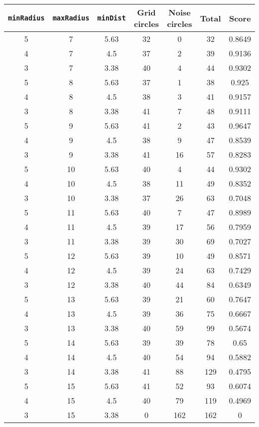 \documentclass[letterpaper, 12pt]{article}
\begin{document}
\begin{longtable}{|c|c|c|c|c|c|c|}
\hline
\textbf{\texttt{minRadius}} & \textbf{\texttt{maxRadius}} & \textbf{\texttt{minDist}} & \textbf{Grid circles} & \textbf{Noise circles} & \textbf{Total} & \textbf{Score} \\
\hline
5 & 7 & 5.63 & 32 & 0 & 32 & 0.8649 \\
\hline
4 & 7 & 4.5 & 37 & 2 & 39 & 0.9136 \\
\hline
3 & 7 & 3.38 & 40 & 4 & 44 & 0.9302 \\
\hline
5 & 8 & 5.63 & 37 & 1 & 38 & 0.925 \\
\hline
4 & 8 & 4.5 & 38 & 3 & 41 & 0.9157 \\
\hline
3 & 8 & 3.38 & 41 & 7 & 48 & 0.9111 \\
\hline
5 & 9 & 5.63 & 41 & 2 & 43 & 0.9647 \\
\hline
4 & 9 & 4.5 & 38 & 9 & 47 & 0.8539 \\
\hline
3 & 9 & 3.38 & 41 & 16 & 57 & 0.8283 \\
\hline
5 & 10 & 5.63 & 40 & 4 & 44 & 0.9302 \\
\hline
4 & 10 & 4.5 & 38 & 11 & 49 & 0.8352 \\
\hline
3 & 10 & 3.38 & 37 & 26 & 63 & 0.7048 \\
\hline
5 & 11 & 5.63 & 40 & 7 & 47 & 0.8989 \\
\hline
4 & 11 & 4.5 & 39 & 17 & 56 & 0.7959 \\
\hline
3 & 11 & 3.38 & 39 & 30 & 69 & 0.7027 \\
\hline
5 & 12 & 5.63 & 39 & 10 & 49 & 0.8571 \\
\hline
4 & 12 & 4.5 & 39 & 24 & 63 & 0.7429 \\
\hline
3 & 12 & 3.38 & 40 & 44 & 84 & 0.6349 \\
\hline
5 & 13 & 5.63 & 39 & 21 & 60 & 0.7647 \\
\hline
4 & 13 & 4.5 & 39 & 36 & 75 & 0.6667 \\
\hline
3 & 13 & 3.38 & 40 & 59 & 99 & 0.5674 \\
\hline
5 & 14 & 5.63 & 39 & 39 & 78 & 0.65 \\
\hline
4 & 14 & 4.5 & 40 & 54 & 94 & 0.5882 \\
\hline
3 & 14 & 3.38 & 41 & 88 & 129 & 0.4795 \\
\hline
5 & 15 & 5.63 & 41 & 52 & 93 & 0.6074 \\
\hline
4 & 15 & 4.5 & 40 & 79 & 119 & 0.4969 \\
\hline
3 & 15 & 3.38 & 0 & 162 & 162 & 0 \\

\end{longtable}
\end{document}
